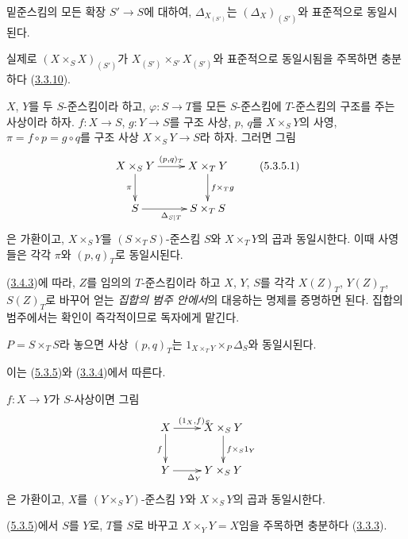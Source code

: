 \begin{corollary}[5.3.4]
\label{I.5.3.4-ko}
밑준스킴의 모든 확장 $S'\to S$에 대하여,
$\Delta_{X_{(S')}}$는 $(\Delta_X)_{(S')}$와 표준적으로 동일시된다.
\end{corollary}

실제로 $(X\times_S X)_{(S')}$가
$X_{(S')}\times_{S'}X_{(S')}$와 표준적으로 동일시됨을 주목하면
충분하다 (\hyperref[I.3.3.10-ko]{3.3.10}).

\begin{proposition}[5.3.5]
\label{I.5.3.5-ko}
$X$, $Y$를 두 $S$-준스킴이라 하고, $\varphi:S\to T$를 모든
$S$-준스킴에 $T$-준스킴의 구조를 주는 사상이라 하자. $f:X\to S$,
$g:Y\to S$를 구조 사상, $p$, $q$를 $X\times_S Y$의 사영,
$\pi=f\circ p=g\circ q$를 구조 사상 $X\times_S Y\to S$라 하자.
그러면 그림
\[
  \xymatrix{
    X\times_S Y\ar[r]^{(p,q)_T}\ar[d]_\pi &
    X\times_T Y\ar[d]^{f\times_T g}\\
    S\ar[r]_{\Delta_{S|T}} &
    S\times_T S
  }
  \tag{5.3.5.1}\label{I.5.3.5.1-ko}
\]
은 가환이고, $X\times_S Y$를 $(S\times_T S)$-준스킴 $S$와
$X\times_T Y$의 곱과 동일시한다. 이때 사영들은 각각 $\pi$와
$(p,q)_T$로 동일시된다.
\end{proposition}

(\hyperref[I.3.4.3-ko]{3.4.3})에 따라, $Z$를 임의의 $T$-준스킴이라
하고 $X$, $Y$, $S$를 각각 $X(Z)_T$, $Y(Z)_T$, $S(Z)_T$로 바꾸어
얻는 \emph{집합의 범주 안에서}의 대응하는 명제를 증명하면 된다.
집합의 범주에서는 확인이 즉각적이므로 독자에게 맡긴다.

\begin{corollary}[5.3.6]
\label{I.5.3.6-ko}
$P=S\times_T S$라 놓으면 사상 $(p,q)_T$는
$1_{X\times_T Y}\times_P\Delta_S$와 동일시된다.
\end{corollary}

이는 (\hyperref[I.5.3.5-ko]{5.3.5})와
(\hyperref[I.3.3.4-ko]{3.3.4})에서 따른다.

\begin{corollary}[5.3.7]
\label{I.5.3.7-ko}
$f:X\to Y$가 $S$-사상이면 그림
\[
  \xymatrix{
    X\ar[r]^{(1_X,f)_S}\ar[d]_f &
    X\times_S Y\ar[d]^{f\times_S 1_Y}\\
    Y\ar[r]_{\Delta_Y} &
    Y\times_S Y
  }
\]
은 가환이고, $X$를 $(Y\times_S Y)$-준스킴 $Y$와
$X\times_S Y$의 곱과 동일시한다.
\end{corollary}

(\hyperref[I.5.3.5-ko]{5.3.5})에서 $S$를 $Y$로, $T$를 $S$로
바꾸고 $X\times_Y Y=X$임을 주목하면 충분하다
(\hyperref[I.3.3.3-ko]{3.3.3}).


